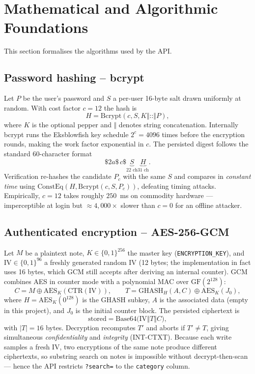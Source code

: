 \documentclass[11pt,a4paper]{article}
\newcommand{\code}[1]{\texttt{\small #1}}
\begin{document}
\section{Mathematical and Algorithmic Foundations}
This section formalises the algorithms used by the API.

\subsection{Password hashing -- bcrypt}
Let $P$ be the user's password and $S$ a per-user 16-byte salt drawn
uniformly at random. With cost factor $c=12$ the hash is
\[
H = \mathrm{Bcrypt}(c, S, K \mathbin{\Vert} \texttt{::} \mathbin{\Vert} P),
\]
where $K$ is the optional pepper and $\Vert$ denotes string
concatenation. Internally bcrypt runs the Eksblowfish key schedule
$2^{c} = 4096$ times before the encryption rounds, making the work
factor exponential in $c$. The persisted digest follows the standard
60-character format
\[
\$2a\$\,c\$\underbrace{S}_{22\text{ ch}}\underbrace{H}_{31\text{ ch}}.
\]
Verification re-hashes the candidate $P_c$ with the same $S$ and
compares in \emph{constant time} using
$\mathrm{ConstEq}(H, \mathrm{Bcrypt}(c, S, P_c))$, defeating timing
attacks. Empirically, $c=12$ takes roughly $250$~ms on commodity
hardware --- imperceptible at login but $\approx 4{,}000\times$ slower
than $c=0$ for an offline attacker.

\subsection{Authenticated encryption -- AES-256-GCM}
Let $M$ be a plaintext note, $K \in \{0,1\}^{256}$ the master key
(\code{ENCRYPTION\_KEY}), and $\mathrm{IV} \in \{0,1\}^{96}$ a freshly
generated random IV (12 bytes; the implementation in fact uses 16
bytes, which GCM still accepts after deriving an internal counter).
GCM combines AES in counter mode with a polynomial MAC over
$\mathrm{GF}(2^{128})$:
\[
C = M \oplus \mathrm{AES}_K(\mathrm{CTR}(\mathrm{IV})),
\qquad
T = \mathrm{GHASH}_H(A, C) \oplus \mathrm{AES}_K(J_0),
\]
where $H = \mathrm{AES}_K(0^{128})$ is the GHASH subkey, $A$ is the
associated data (empty in this project), and $J_0$ is the initial
counter block. The persisted ciphertext is
\[
\text{stored} = \mathrm{Base64}\bigl(\mathrm{IV} \mathbin{\Vert} T \mathbin{\Vert} C\bigr),
\]
with $|T|=16$ bytes. Decryption recomputes $T'$ and aborts if
$T' \ne T$, giving simultaneous \emph{confidentiality} and
\emph{integrity} (INT-CTXT). Because each write samples a fresh IV,
two encryptions of the same note produce different ciphertexts, so
substring search on notes is impossible without decrypt-then-scan ---
hence the API restricts \code{?search=} to the \code{category} column.
\end{document}
